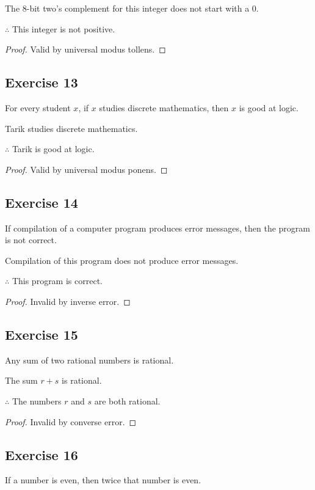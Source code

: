 \documentclass[14pt]{extarticle}
\begin{document}
The 8-bit two’s complement for this integer does not start with a 0.

$\therefore$ This integer is not positive.

\begin{proof}
    Valid by universal modus tollens.
\end{proof}

\subsection{Exercise 13}
For every student $x$, if $x$ studies discrete mathematics, then $x$ is good at logic.

Tarik studies discrete mathematics.

$\therefore$ Tarik is good at logic.

\begin{proof}
    Valid by universal modus ponens.
\end{proof}

\subsection{Exercise 14}
If compilation of a computer program produces error messages, then the program is not correct.

Compilation of this program does not produce error messages.

$\therefore$ This program is correct.

\begin{proof}
    Invalid by inverse error.
\end{proof}

\subsection{Exercise 15}
Any sum of two rational numbers is rational.

The sum $r + s$ is rational.

$\therefore$ The numbers $r$ and $s$ are both rational.

\begin{proof}
    Invalid by converse error.
\end{proof}

\subsection{Exercise 16}
If a number is even, then twice that number is even.
\end{document}
